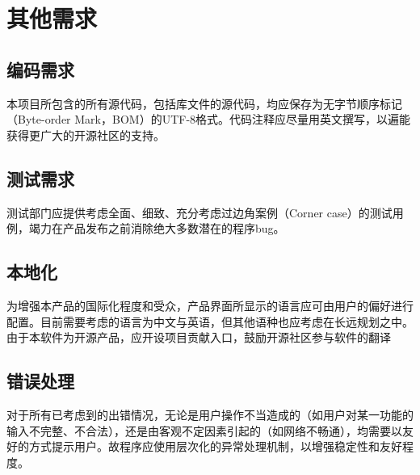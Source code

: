 \chapter{其他需求}


\section{编码需求}
本项目所包含的所有源代码，包括库文件的源代码，均应保存为无字节顺序标记（Byte-order Mark，BOM）的UTF-8格式。代码注释应尽量用英文撰写，以遍能获得更广大的开源社区的支持。

\section{测试需求}
测试部门应提供考虑全面、细致、充分考虑过边角案例（Corner case）的测试用例，竭力在产品发布之前消除绝大多数潜在的程序bug。

\section{本地化}
为增强本产品的国际化程度和受众，产品界面所显示的语言应可由用户的偏好进行配置。目前需要考虑的语言为中文与英语，但其他语种也应考虑在长远规划之中。
由于本软件为开源产品，应开设项目贡献入口，鼓励开源社区参与软件的翻译

\section{错误处理}
对于所有已考虑到的出错情况，无论是用户操作不当造成的（如用户对某一功能的输入不完整、不合法），还是由客观不定因素引起的（如网络不畅通），均需要以友好的方式提示用户。故程序应使用层次化的异常处理机制，以增强稳定性和友好程度。